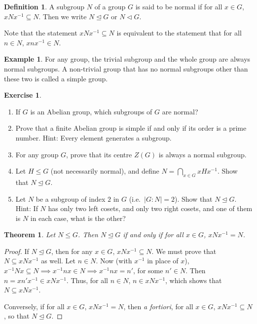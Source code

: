 \documentclass[svgnames]{article}
\newtheorem{Theorem}{Theorem}[section]
\theoremstyle{definition}
\newtheorem{Definition}[Definition]{Definition}
\newtheorem{Example}[Example]{Example}
\newtheorem{Exercise}{Exercise}[section]
\theoremstyle{remark}
\newcommand{\newterm}[1]{{\color{alertcolor} #1}}
\begin{document}
\begin{Definition}\label{def:NormSubgroup}
A subgroup $N$ of a group $G$ is said to be \newterm{normal} if for all $x \in G$, $xNx^{-1} \subseteq N$. Then we write $N \unlhd G$ or $N \lhd G$.
\end{Definition}
Note that the statement $xNx^{-1} \subseteq N$ is equivalent to the statement that for all $n \in N$, $xnx^{-1} \in N$.

\begin{Example}
For any group, the trivial subgroup and the whole group are always normal subgroups. A non-trivial group that has no normal subgroups other than these two is called a \newterm{simple group}.
\end{Example}

\begin{Exercise}
\begin{enumerate}
\item If $G$ is an Abelian group, which subgroups of $G$ are normal?
\item Prove that a finite Abelian group is simple if and only if its order is a prime number. {\tiny Hint: Every element generates a subgroup.}
\item For any group $G$, prove that its centre $Z(G)$ is always a normal subgroup.
\item Let $H \le G$ (not necessarily normal), and define $N = \bigcap\limits_{x \in G} xHx^{-1}$. Show that $N \unlhd G$.
\item Let $N$ be a subgroup of index $2$ in $G$ (i.e.\ $|G : N| = 2$). Show that $N \unlhd G$. {\tiny Hint: If $N$ has only two left cosets, and only two right cosets, and one of them is $N$ in each case, what is the other?}
\end{enumerate}
\end{Exercise}

\begin{Theorem}
Let $N \le G$. Then $N \unlhd G$ if and only if for all $x \in G$, $xNx^{-1} = N$.
\end{Theorem}

\begin{proof}
If $N \unlhd G$, then for any $x \in G$, $xNx^{-1} \subseteq N$. We must prove that $N \subseteq xNx^{-1}$ as well. Let $n \in N$. Now (with $x^{-1}$ in place of $x$), $x^{-1}Nx \subseteq N \implies x^{-1}nx \in N \implies x^{-1}nx = n'$, for some $n' \in N$. Then $n = xn'x^{-1} \in xNx^{-1}$. Thus, for all $n \in N$, $n \in xNx^{-1}$, which shows that $N \subseteq xNx^{-1}$.

Conversely, if for all $x \in G$, $xNx^{-1} = N$, then \emph{a fortiori}, for all $x \in G$, $xNx^{-1} \subseteq N$, so that $N \unlhd G$.
\end{proof}
\end{document}
